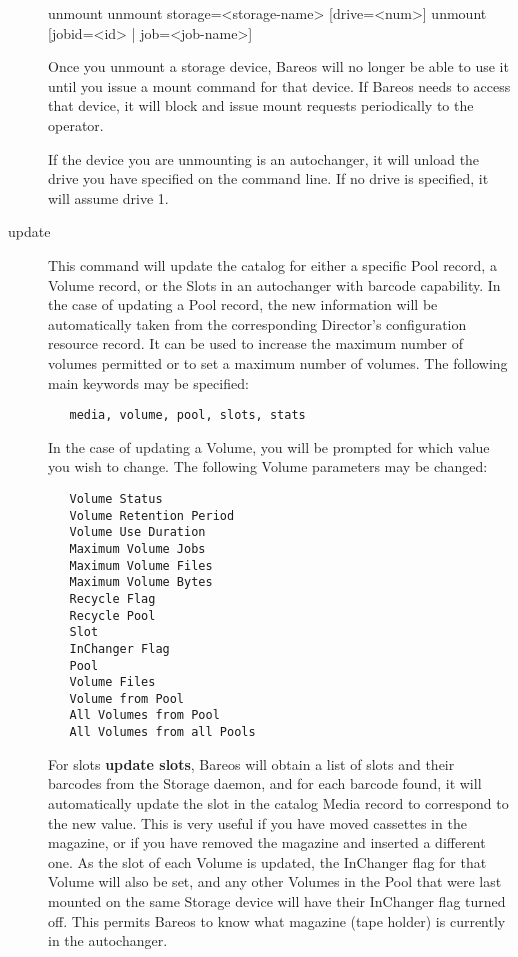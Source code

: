 \begin{description}
\begin{bconsole}{unmount}
unmount storage=<storage-name> [drive=<num>]
unmount [jobid=<id> | job=<job-name>]
\end{bconsole}

   Once you unmount a storage device, Bareos will no longer be able to use
   it until you issue a mount command for that device. If Bareos needs to
   access that device, it will block and issue mount requests periodically
   to the operator.

   If the device you are unmounting is an autochanger, it will unload
   the drive you have specified on the command line. If no drive is
   specified, it will assume drive 1.

\item [update]
   \label{UpdateCommand}
   This command will update the catalog for either a specific Pool record, a Volume
   record, or the Slots in an  autochanger with barcode capability. In the case
   of updating a  Pool record, the new information will be automatically taken
   from  the corresponding Director's configuration resource record. It  can be
   used to increase the maximum number of volumes permitted or  to set a maximum
   number of volumes. The following main  keywords may be specified:

\footnotesize
\begin{verbatim}
   media, volume, pool, slots, stats
\end{verbatim}
\normalsize

In the case of updating a  Volume, you will be prompted for which value you
wish to change.  The following Volume parameters may be changed:

\footnotesize
\begin{verbatim}
   Volume Status
   Volume Retention Period
   Volume Use Duration
   Maximum Volume Jobs
   Maximum Volume Files
   Maximum Volume Bytes
   Recycle Flag
   Recycle Pool
   Slot
   InChanger Flag
   Pool
   Volume Files
   Volume from Pool
   All Volumes from Pool
   All Volumes from all Pools
\end{verbatim}
\normalsize

   For slots {\bf update slots}, Bareos will obtain a list of slots and
   their barcodes from the Storage daemon, and for each barcode found, it
   will automatically update the slot in the catalog Media record to
   correspond to the new value.  This is very useful if you have moved
   cassettes in the magazine, or if you have removed the magazine and
   inserted a different one.  As the slot of each Volume is updated, the
   InChanger flag for that Volume will also be set, and any other Volumes
   in the Pool that were last mounted on the same Storage device
   will have their InChanger flag turned off.  This permits
   Bareos to know what magazine (tape holder) is currently in the
   autochanger.


\end{description}
